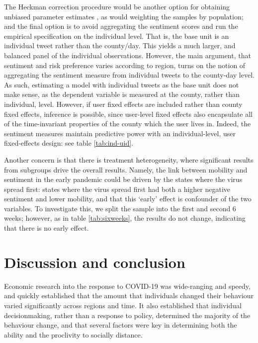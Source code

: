 \documentclass{article}
\begin{document}
The Heckman correction procedure would be another option for obtaining unbiased parameter estimates \parencite{wooldridgeSelectionCorrectionsPanel1995}, as would weighting the samples by population; and the final option is to avoid aggregating the sentiment scores and run the empirical specification on the individual level. That is, the base unit is an individual tweet rather than the county/day. This yields a much larger, and balanced panel of the individual observations. However, the main argument, that sentiment and risk preference varies according to region, turns on the notion of aggregating the sentiment measure from individual tweets to the county-day level. As such, estimating a model with individual tweets as the base unit does not make sense, as the dependent variable is measured at the county, rather than individual, level. However, if user fixed effects are included rather than county fixed effects, inference is possible, since user-level fixed effects also encapsulate all of the time-invariant properties of the county which the user lives in. Indeed, the sentiment measures maintain predictive power with an individual-level, user fixed-effects design: see table \ref{tab:ind-uid}.

Another concern is that there is treatment heterogeneity, where significant results from subgroups drive the overall results. Namely, the link between mobility and sentiment in the early pandemic could be driven by the states where the virus spread first: states where the virus spread first had both a higher negative sentiment and lower mobility, and that this `early' effect is confounder of the two variables. To investigate this, we split the sample into the first and second 6 weeks; however, as in table \ref{tab:sixweeks}, the results do not change, indicating that there is no early effect.

\section{Discussion and conclusion} 
Economic research into the response to COVID-19 was wide-ranging and speedy, and quickly established that the amount that individuals changed their behaviour varied significantly across regions and time. It also established that individual decisionmaking, rather than a response to policy, determined the majority of the behaviour change, and that several factors were key in determining both the ability and the proclivity to socially distance. 
\end{document}
